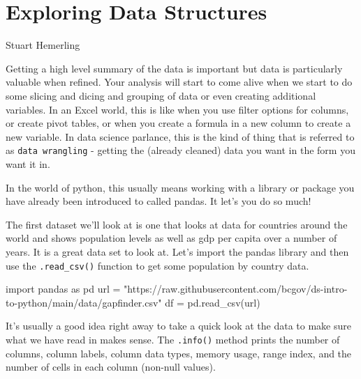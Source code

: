 \documentclass[
  letterpaper,
  DIV=11,
  numbers=noendperiod]{scrreprt}
\newenvironment{Shaded}{\begin{snugshade}}{\end{snugshade}}
\newcommand{\ImportTok}[1]{\textcolor[rgb]{0.00,0.46,0.62}{#1}}
\newcommand{\NormalTok}[1]{\textcolor[rgb]{0.00,0.23,0.31}{#1}}
\newcommand{\OperatorTok}[1]{\textcolor[rgb]{0.37,0.37,0.37}{#1}}
\newcommand{\StringTok}[1]{\textcolor[rgb]{0.13,0.47,0.30}{#1}}
\begin{document}

\hypertarget{exploring-data-structures}{%
\chapter{Exploring Data Structures}\label{exploring-data-structures}}

Stuart Hemerling

\hfill\break

Getting a high level summary of the data is important but data is
particularly valuable when refined. Your analysis will start to come
alive when we start to do some slicing and dicing and grouping of data
or even creating additional variables. In an Excel world, this is like
when you use filter options for columns, or create pivot tables, or when
you create a formula in a new column to create a new variable. In data
science parlance, this is the kind of thing that is referred to as
\texttt{data\ wrangling} - getting the (already cleaned) data you want
in the form you want it in.

In the world of python, this usually means working with a library or
package you have already been introduced to called pandas. It let's you
do so much!

The first dataset we'll look at is one that looks at data for countries
around the world and shows population levels as well as gdp per capita
over a number of years. It is a great data set to look at. Let's import
the pandas library and then use the \texttt{.read\_csv()} function to
get some population by country data.

\begin{Shaded}
\begin{Highlighting}[]
\ImportTok{import}\NormalTok{ pandas }\ImportTok{as}\NormalTok{ pd}
\NormalTok{url }\OperatorTok{=} \StringTok{"https://raw.githubusercontent.com/bcgov/ds{-}intro{-}to{-}python/main/data/gapfinder.csv"}
\NormalTok{df }\OperatorTok{=}\NormalTok{ pd.read\_csv(url)}
\end{Highlighting}
\end{Shaded}

It's usually a good idea right away to take a quick look at the data to
make sure what we have read in makes sense. The \texttt{.info()} method
prints the number of columns, column labels, column data types, memory
usage, range index, and the number of cells in each column (non-null
values).
\end{document}
